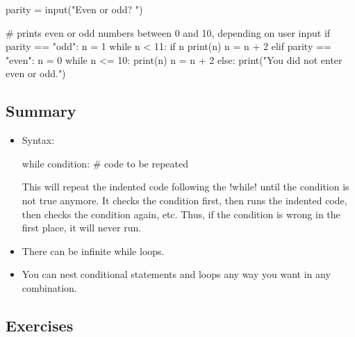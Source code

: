 \documentclass[11pt]{cselabheader}
\begin{document}
\begin{python3code}
parity = input("Even or odd? ")

# prints even or odd numbers between 0 and 10, depending on user input
if parity == "odd":
    n = 1
    while n < 11:
        if n %
            print(n)
        n = n + 2
elif parity == "even":
    n = 0
    while n <= 10:
        print(n)
        n = n + 2
else:
    print("You did not enter even or odd.")
\end{python3code}

\subsection{Summary}

\begin{itemize}
    \item Syntax:

      \begin{python3code}
while condition:
    # code to be repeated
      \end{python3code}

    This will repeat the indented code following the \pythoninline!while! until the
    condition is not true anymore. It checks the condition first, then runs the
    indented code, then checks the condition again, etc. Thus, if the condition
    is wrong in the first place, it will never run.

%
%

  \item There can be infinite while loops.
  \item You can nest conditional statements and loops any way you want in any
    combination.
\end{itemize}

\pagebreak
\subsection{Exercises}
\label{subsec:whileex}
\end{document}
